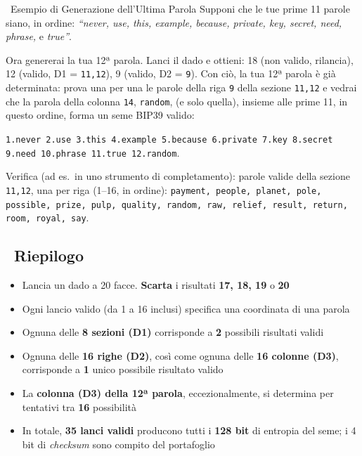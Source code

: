 \documentclass[10pt]{article}
\begin{document}
\begin{examplebox}{\faLightbulb~Esempio di Generazione dell'Ultima Parola}
Supponi che le tue prime 11 parole siano, in ordine: \textit{``never, use, this, example, because, private, key, secret, need, phrase,} e \textit{true''}.

Ora genererai la tua 12ª parola. Lanci il dado e ottieni: 18 (non valido, rilancia), 12 (valido, D1 = \texttt{11,12}), 9 (valido, D2 = \texttt{9}). Con ciò, la tua 12ª parola è già determinata: prova una per una le parole della riga \texttt{9} della sezione \texttt{11,12} e vedrai che la parola della colonna \texttt{14}, \texttt{random}, (e solo quella), insieme alle prime 11, in questo ordine, forma un seme BIP39 valido:

\vspace{0.5em}
\texttt{1.never 2.use 3.this 4.example 5.because 6.private 7.key 8.secret 9.need 10.phrase 11.true 12.random}. \faCheckCircle
\vspace{0.25em}

{\scriptsize Verifica (ad es.\ in uno strumento di completamento): parole valide della sezione \texttt{11,12}, una per riga (1--16, in ordine): \texttt{payment, people, planet, pole, possible, prize, pulp, quality, random, raw, relief, result, return, room, royal, say}.\par}
\end{examplebox}

\subsection*{\faListOl~Riepilogo}

\begin{itemize}[itemsep=1pt]
 \item Lancia un dado a 20 facce. \textbf{Scarta} i risultati \textbf{17, 18, 19} o \textbf{20}
 \item Ogni lancio valido (da 1 a 16 inclusi) specifica una coordinata di una parola
 \item Ognuna delle \textbf{8 sezioni (D1)} corrisponde a \textbf{2} possibili risultati validi
 \item Ognuna delle \textbf{16 righe (D2)}, così come ognuna delle \textbf{16 colonne (D3)}, corrisponde a \textbf{1} unico possibile risultato valido
 \item La \textbf{colonna (D3) della 12ª parola}, eccezionalmente, si determina per tentativi tra \textbf{16} possibilità
 \item In totale, \textbf{35 lanci validi} producono tutti i \textbf{128 bit} di entropia del seme; i 4 bit di \textit{checksum} sono compito del portafoglio
\end{itemize}
\end{document}
